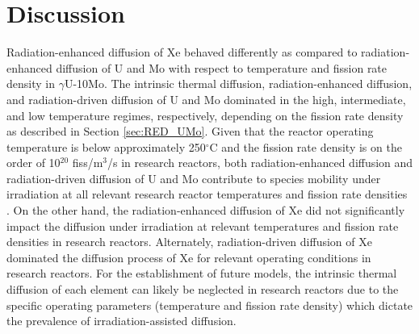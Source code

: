 \documentclass[preprint,12pt]{elsarticle}
\begin{document}
\FloatBarrier

\section{Discussion}
\label{sec:Discussion}
\indent Radiation-enhanced diffusion of Xe behaved differently as compared to radiation-enhanced diffusion of U and Mo with respect to temperature and fission rate density in $\gamma$U-10Mo. The intrinsic thermal diffusion, radiation-enhanced diffusion, and radiation-driven diffusion of U and Mo dominated in the high, intermediate, and low temperature regimes, respectively, depending on the fission rate density as described in Section \ref{sec:RED_UMo}. Given that the reactor operating temperature is below approximately 250$^{\circ}$C and the fission rate density is on the order of 10$^{20}$ fiss/m$^{3}$/s in research reactors, both radiation-enhanced diffusion and radiation-driven diffusion of U and Mo contribute to species mobility under irradiation at all relevant research reactor temperatures and fission rate densities \cite{meyer2014irradiation, marshall2016new}. On the other hand, the radiation-enhanced diffusion of Xe did not significantly impact the diffusion under irradiation at relevant temperatures and fission rate densities in research reactors. Alternately, radiation-driven diffusion of Xe dominated the diffusion process of Xe for relevant operating conditions in research reactors. For the establishment of future models, the intrinsic thermal diffusion of each element can likely be neglected in research reactors due to the specific operating parameters (temperature and fission rate density) which dictate the prevalence of irradiation-assisted diffusion. \\
\end{document}
